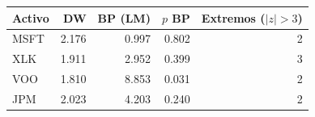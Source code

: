 \begin{tabular}{lrrrr}
\hline
Activo & DW & BP (LM) & $p$ BP & Extremos ($|z|>3$) \\
\hline
MSFT & 2.176 & 0.997 & 0.802 & 2 \\
XLK & 1.911 & 2.952 & 0.399 & 3 \\
VOO & 1.810 & 8.853 & 0.031 & 2 \\
JPM & 2.023 & 4.203 & 0.240 & 2 \\
\hline
\end{tabular}
